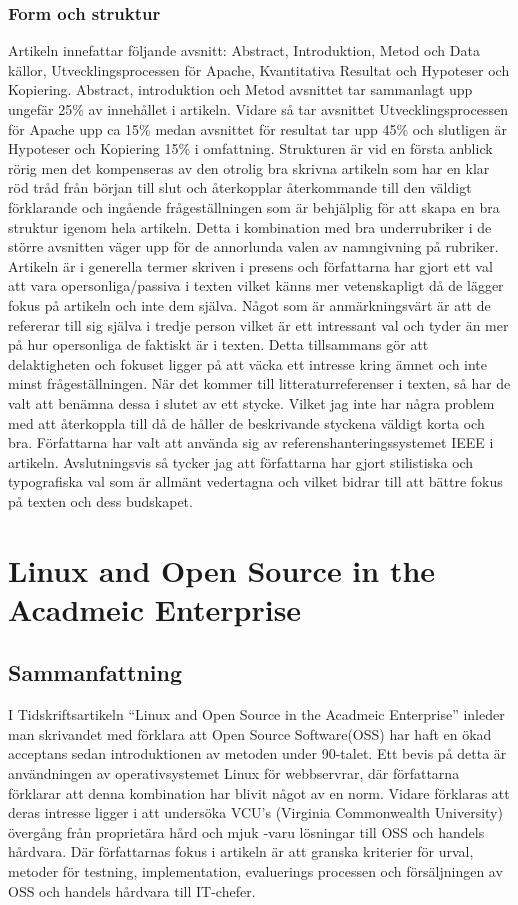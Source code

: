 \documentclass[a4paper]{article}
\begin{document}
\subsubsection{Form och struktur}

Artikeln innefattar följande avsnitt: Abstract, Introduktion, Metod och Data källor, Utvecklingsprocessen för Apache, Kvantitativa Resultat och Hypoteser och Kopiering. Abstract, introduktion och Metod avsnittet tar sammanlagt upp ungefär 25\% av innehållet i artikeln. Vidare så tar avsnittet Utvecklingsprocessen för Apache upp ca 15\% medan avsnittet för resultat tar upp 45\% och slutligen är Hypoteser och Kopiering 15\% i omfattning. Strukturen är vid en första anblick rörig men det kompenseras av den otrolig bra skrivna artikeln som har en klar röd tråd från början till slut och återkopplar återkommande till den väldigt förklarande och ingående frågeställningen som är behjälplig för att skapa en bra struktur igenom hela artikeln. Detta i kombination med bra underrubriker i de större avsnitten väger upp för de annorlunda valen av namngivning på rubriker. Artikeln är i generella termer skriven i presens och författarna har gjort ett val att vara opersonliga/passiva i texten vilket känns mer vetenskapligt då de lägger fokus på artikeln och inte dem själva. Något som är anmärkningsvärt är att de refererar till sig själva i tredje person vilket är ett intressant val och tyder än mer på hur opersonliga de faktiskt är i texten. Detta tillsammans gör att delaktigheten och fokuset ligger på att väcka ett intresse kring ämnet och inte minst frågeställningen. 
När det kommer till litteraturreferenser i texten, så har de valt att benämna dessa i slutet av ett stycke. Vilket jag inte har några problem med att återkoppla till då de håller de beskrivande styckena väldigt korta och bra. Författarna har valt att använda sig av referenshanteringssystemet IEEE i artikeln. Avslutningsvis så tycker jag att författarna har gjort stilistiska och typografiska val som är allmänt vedertagna och vilket bidrar till att bättre fokus på texten och dess budskapet. 


\newpage
\section{Linux and Open Source in the Acadmeic Enterprise}
\subsection{Sammanfattning}
I Tidskriftsartikeln “Linux and Open Source in the Acadmeic Enterprise” inleder man skrivandet med förklara att Open Source Software(OSS) har haft en ökad acceptans sedan introduktionen av metoden under 90-talet. Ett bevis på detta är användningen av operativsystemet Linux för webbservrar, där författarna förklarar att denna kombination har blivit något av en norm. Vidare förklaras att deras intresse ligger i att undersöka VCU’s (Virginia Commonwealth University) övergång från proprietära hård och mjuk -varu lösningar till OSS och handels hårdvara. Där författarnas fokus i artikeln är att granska kriterier för urval, metoder för testning, implementation, evaluerings processen och försäljningen av OSS och handels hårdvara till IT-chefer. 
\end{document}
